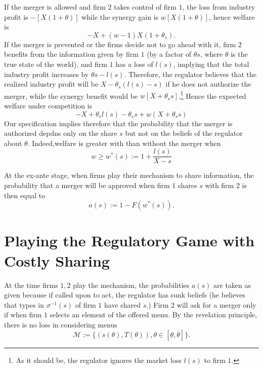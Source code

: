 \documentclass[a4paper]{article}
\newcommand{\M}{\mathcal M}
\renewcommand{\t}{\theta}
\begin{document}
    If the merger is allowed and firm $2$ takes control of firm $1$, the loss from industry profit is $-[X(1+\t)]$ while the synergy gain is $w[X(1+\t)]$, hence welfare is
    $$-X+(w-1)X(1+\t_s).$$
    If the merger is prevented or the firms decide not to go ahead with it, firm $2$ benefits from the information given by firm $1$ (by a factor of $\t s$, where $\t$ is the true state of the world), and firm $1$ has a loss of $l(s)$, implying that the total industry profit increases by $\t s -l(s)$. Therefore, the regulator believes that the realized industry profit will be $X-\t_s(l(s)-s)$   if he does not authorize the merger, while the synergy benefit would be $w[X+\t_s s]$.\footnote{%
    As it should be, the regulator ignores the market loss $l(s)$ to firm $1$.} Hence the expected welfare under competition is
      $$-X+\theta_s l(s)-\t_s s + w (X+\t_s s)$$
      Our specification implies therefore that the probability that the merger is authorized depdns only on the share $s$ but not on the beliefs of the regulator about $\t$. Indeed,welfare is greater with than without the merger when 
    \begin{equation}
           w\geq w^*(s):=1 + \frac{l(s)}{X-s}
    \end{equation}


At the ex-ante stage, when firms play their mechanism to share information, the probability that a merger will be approved when firm $1$ shares $s$ with firm $2$ is then equal to  
\[
a(s):=1-F(w^*(s)).
\]

\section{Playing the Regulatory Game with Costly Sharing}
At the time firms $1,2$ play the mechanism, the probabilities $a(s)$  are taken as given because if called upon to act, the regulator has sunk beliefs (he believes that types in $\sigma^{-1}(s)$ of firm $1$ have shared $s$.) Firm $2$ will ask for a merger only if when firm $1$ selects an element of the offered menu. By the revelation principle, there is no loss in considering menus
\[
\M:=\{(s(\t),T(\t)),\theta\in[\underline \t,\overline \t]\}.
\]
%
\end{document}
